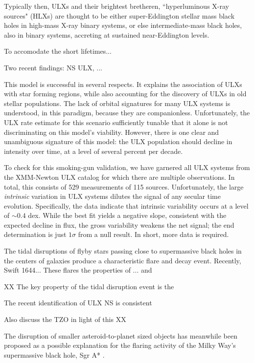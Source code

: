 Typically then, ULXs and their brightest bretheren, ``hyperluminous X-ray sources" (HLXs) are thought to be either super-Eddington stellar mass black holes in high-mass X-ray binary systems, or else intermediate-mass black holes, also in binary systems, accreting at sustained near-Eddington levels.    

To accomodate the short lifetimes... 


Two recent findings:  NS ULX, ...








This model is successful in several respects. It explains the
association of ULXs with star forming regions, while also accounting
for the discovery of ULXs in old stellar populations.  The
lack of orbital signatures for many ULX systems is understood, in this
paradigm, because they are companionless.  Unfortunately, the ULX rate
estimate for this scenario sufficiently tunable that it alone is not
discriminating on this model's viability.  However, there is one clear
and unambiguous signature of this model: the ULX population should
decline in intensity over time, at a level of several percent per
decade.

To check for this smoking-gun validation, we have garnered all ULX
systems from the \citet{Walton_2011} XMM-Newton ULX catalog for which
there are multiple observations.  In total, this consists of 529
measurements of 115 sources.  Unfortunately, the large {\em intrinsic}
variation in ULX systems dilutes the signal of any secular time
evolution.  Specifically, the data indicate that intrinsic variability
occurs at a level of $\sim0.4$ dex.  While the best fit yields a
negative slope, consistent with the expected decline in flux, the
gross variability weakens the net signal; the end determination is
just $1\sigma$ from a null result.  In short, more data is required.


The tidal disruptions of flyby stars passing close to supermassive
black holes in the centers of galaxies produce a characteristic 
flare and decay event.  Recently, Swift 1644...
These flares the properties of ... and 



XX
The key property of the tidal disruption event is the 

The recent identification of ULX NS is consistent 

Also discuss the TZO in light of this
XX


The disruption of smaller asteroid-to-planet sized objects has
meanwhile been proposed as a possible explanation for the flaring
activity of the Milky Way's supermassive black hole, Sgr A* \citep{SSS}.


